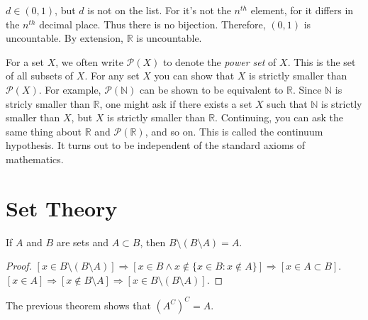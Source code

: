         $d\in(0,1)$, but $d$ is not on the list. For it's not
        the $n^{th}$ element, for it differs in the
        $n^{th}$ decimal place. Thus there is no bijection.
        Therefore, $(0,1)$ is uncountable. By extension,
        $\mathbb{R}$ is uncountable.
        \par\hfill\par
        \vspace{-2ex}
        For a set $X$, we often write
        $\mathcal{P}(X)$ to denote the
        \textit{power set} of $X$. This is the
        set of all subsets of $X$.
        For any set $X$ you can show that $X$ is
        strictly smaller than $\mathcal{P}(X)$.
        For example, $\mathcal{P}(\mathbb{N})$
        can be shown to be equivalent to $\mathbb{R}$.
        Since $\mathbb{N}$ is stricly smaller than
        $\mathbb{R}$, one might ask if there exists
        a set $X$ such that $\mathbb{N}$ is strictly
        smaller than $X$, but $X$ is strictly smaller
        than $\mathbb{R}$. Continuing, you can ask the
        same thing about $\mathbb{R}$ and
        $\mathcal{P}(\mathbb{R})$, and so on.
        This is called the continuum hypothesis.
        It turns out to be independent of
        the standard axioms of mathematics.
    \section{Set Theory}
        \begin{theorem}
            If $A$ and $B$ are sets and $A\subset B$,
            then $B\setminus(B\setminus A)=A$.
        \end{theorem}
        \begin{proof}
            $[x\in B\setminus(B\setminus{A})]%
             \Rightarrow[x\in{B}\land{x}\notin%
             \{x\in{B}:x\notin{A}\}]%
             \Rightarrow[x\in{A}\subset{B}]$.
             $[x\in{A}]\Rightarrow[x\notin{B}\setminus{A}]%
             \Rightarrow[x\in{B}\setminus(B\setminus{A})]$.
        \end{proof}
        The previous theorem shows that $(A^C)^{C}=A$.
